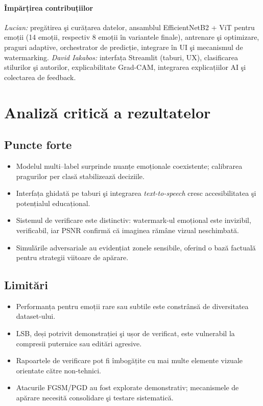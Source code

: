 \paragraph{Împărțirea contribuțiilor}
\emph{Lucian:} pregătirea şi curățarea datelor, ansamblul EfficientNetB2 + ViT pentru emoții (14 emoții, respectiv 8 emoții în variantele finale), antrenare şi optimizare, praguri adaptive, orchestrator de predicție, integrare în UI şi mecanismul de watermarking. \emph{David Iakabos:} interfața Streamlit (taburi, UX), clasificarea stilurilor şi autorilor, explicabilitate Grad-CAM, integrarea explicațiilor AI şi colectarea de feedback.

\section{Analiză critică a rezultatelor}
\subsection*{Puncte forte}
\begin{itemize}
  \item Modelul multi--label surprinde nuanțe emoționale coexistente; calibrarea pragurilor per clasă stabilizează deciziile.
  \item Interfața ghidată pe taburi şi integrarea \emph{text-to-speech} cresc accesibilitatea şi potențialul educațional.
  \item Sistemul de verificare este distinctiv: watermark-ul emoțional este invizibil, verificabil, iar PSNR confirmă că imaginea rămâne vizual neschimbată.
  \item Simulările adversariale au evidențiat zonele sensibile, oferind o bază factuală pentru strategii viitoare de apărare.
\end{itemize}

\subsection*{Limitări}
\begin{itemize}
  \item Performanța pentru emoții rare sau subtile este constrânsă de diversitatea dataset-ului.
  \item LSB, deși potrivit demonstrației şi ușor de verificat, este vulnerabil la compresii puternice sau editări agresive.
  \item Rapoartele de verificare pot fi îmbogățite cu mai multe elemente vizuale orientate către non-tehnici.
  \item Atacurile FGSM/PGD au fost explorate demonstrativ; mecanismele de apărare necesită consolidare şi testare sistematică.
\end{itemize}

